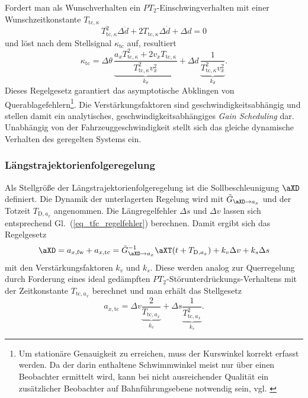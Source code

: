 Fordert man als Wunschverhalten ein $PT_2$-Einschwingverhalten mit einer Wunschzeitkonstante $T_{\mathrm{tc},\kappa}$
%
\begin{equation}  
T_{\mathrm{tc},\kappa}^2 \Delta \ddot d + 2T_{\mathrm{tc},\kappa} \Delta \dot d + \Delta d = 0
\end{equation}
und löst nach dem Stellsignal $\kappa_\mathrm{tc}$ auf,  resultiert
\begin{equation}
\kappa_\mathrm{tc} = \Delta  \theta\, \underbrace{\frac{a_x T_{\mathrm{tc},\kappa}^2 + 2 v_x  T_{\mathrm{tc},\kappa}}{T_{\mathrm{tc},\kappa}^2 v_x^2}}_{k_\theta} + \Delta d \, \underbrace{\frac{1}{T_{\mathrm{tc},\kappa}^2 v_x^2}}_{k_d}.
\end{equation}
Dieses Regelgesetz garantiert das asymptotische Abklingen von Querablagefehlern\footnote{Um stationäre Genauigkeit zu erreichen,  muss der Kurswinkel korrekt erfasst werden.  Da der darin enthaltene Schwimmwinkel meist nur über einen Beobachter ermittelt wird,  kann bei nicht ausreichender Qualität ein zusätzlicher Beobachter auf Bahnführungsebene notwendig sein, vgl. \cite{Rathgeber2016}}.  Die Verstärkungsfaktoren sind geschwindigkeitsabhängig und stellen damit ein analytisches,  geschwindigkeitsabhängiges \textit{Gain Scheduling} dar. Unabhängig von der Fahrzeuggeschwindigkeit stellt sich das gleiche dynamische Verhalten des geregelten Systems ein.
\subsubsection{Längstrajektorienfolgeregelung}
Als Stellgröße der Längstrajektorienfolgeregelung ist die Sollbeschleunigung $\aXD$ definiert.  Die Dynamik der unterlagerten Regelung wird mit $\tilde G_{\aXD\rightarrow a_x }$ und der Totzeit $T_{\mathrm{D},a_x}$ angenommen. Die Längregelfehler $\Delta s$ und $\Delta v$ lassen sich entsprechend Gl.~(\ref{eq_tfc_regelfehler}) berechnen.  Damit ergibt sich das Regelgesetz
\begin{equation}
\aXD= a_{x,\mathrm{fw}} + a_{x,\mathrm{tc}} = \tilde G_{\aXD\rightarrow a_x}^{-1}  \aXT(t+T_{\mathrm{D},a_x})+ k_{v} \Delta v + k_s \Delta s
\end{equation}
mit den Verstärkungsfaktoren $k_v$ und $k_s$.  Diese werden analog zur Querregelung durch Forderung eines ideal gedämpften $PT_2$-Störunterdrückungs-Verhaltens mit der Zeitkonstante $T_{\mathrm{tc},a_x}$ berechnet und man erhält das Stellgesetz
\begin{equation}
a_{x,\mathrm{tc}} = \Delta v \underbrace{\frac{2}{T_{\mathrm{tc},a_x}}}_{k_v} + \Delta s \underbrace{\frac{1}{T_{\mathrm{tc},a_x}^2}}_{k_s}.
\end{equation}


\FloatBarrier
